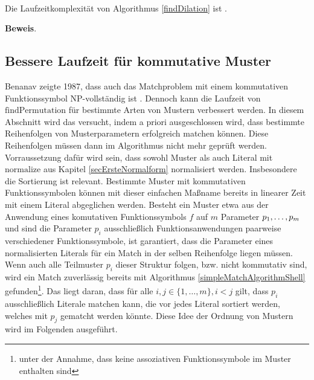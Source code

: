 \begin{lemma}\label{lemKomplexitaetDilation}~\\
Die Laufzeitkomplexität von Algorithmus \ref{findDilation} ist .
\end{lemma}

\textbf{Beweis}.\\

\subsection{Bessere Laufzeit für kommutative Muster} \label{subsecCMuster}

Benanav zeigte 1987, dass auch das Matchproblem mit einem kommutativen Funktionssymbol NP-vollständig ist \cite{NPHardMatching}. Dennoch kann die Laufzeit von $\mathrm{findPermutation}$ für bestimmte Arten von Mustern verbessert werden. In diesem Abschnitt wird das versucht, indem a priori ausgeschlossen wird, dass bestimmte Reihenfolgen von Musterparametern erfolgreich matchen können. Diese Reihenfolgen müssen dann im Algorithmus nicht mehr geprüft werden.
Vorraussetzung dafür wird sein, dass sowohl Muster als auch Literal mit $\mathrm{normalize}$ aus Kapitel \ref{secErsteNormalform} normalisiert werden. Insbesondere die Sortierung ist relevant.
Bestimmte Muster mit kommutativen Funktionssymbolen können mit dieser einfachen Maßname bereits in linearer Zeit mit einem Literal abgeglichen werden. Besteht ein Muster etwa aus der Anwendung eines komutativen Funktionssymbols $f$ auf $m$ Parameter ${p}_{1}, \dots, {p}_{m}$ und sind die Parameter $p_i$ ausschließlich Funktionsanwendungen paarweise verschiedener Funktionssymbole, ist garantiert, dass die Parameter eines normalisierten Literals für ein Match in der selben Reihenfolge liegen müssen. Wenn auch alle Teilmuster $p_i$ dieser Struktur folgen, bzw. nicht kommutativ sind, wird ein Match zuverlässig bereits mit Algorithmus \ref{simpleMatchAlgorithmShell} gefunden\footnote{unter der Annahme, dass keine assoziativen Funktionssymbole im Muster enthalten sind}. Das liegt daran, dass für alle $i, j \in \{1, \dots, m\}, i < j$ gilt, dass $p_i$ ausschließlich Literale matchen kann, die vor jedes Literal sortiert werden, welches mit $p_j$ gematcht werden könnte. Diese Idee der Ordnung von Mustern wird im Folgenden ausgeführt.


